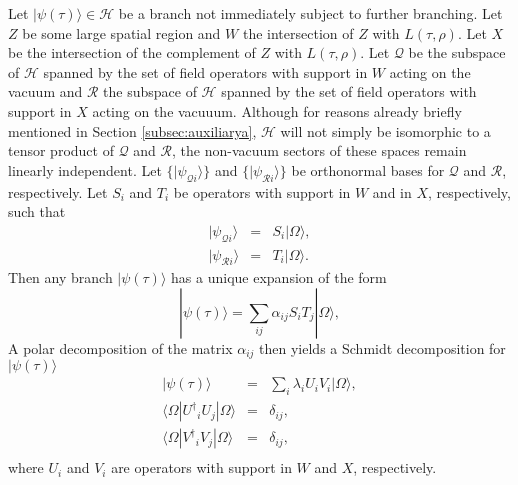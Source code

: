 \documentclass[twocolumn,amsmath,amssymb]{revtex4-1}
\begin{document}
Let $|\psi( \tau) \rangle  \in \mathcal{H}$ be a branch
not immediately
subject to further branching.
Let $Z$ be some large spatial region and
$W$ the intersection of $Z$ with $L( \tau, \rho)$.
Let $X$ be the intersection of the complement
of $Z$ with $L( \tau, \rho)$.
Let $\mathcal{Q}$ be the subspace of $\mathcal{H}$ spanned
by the set of field operators with support in $W$ acting
on the vacuum
and $\mathcal{R}$ the subspace of $\mathcal{H}$ spanned
by the set of field operators with support in $X$
acting on the vacuuum.
Although for reasons 
already briefly mentioned in Section \ref{subsec:auxiliarya},
$\mathcal{H}$ will not simply be isomorphic to a tensor product of
$\mathcal{Q}$ and $\mathcal{R}$, the non-vacuum sectors of
these spaces
remain linearly independent.
Let
$\{ |\psi_{\mathcal{Q}i} \rangle  \}$ and $\{| \psi_{\mathcal{R}i} \rangle  \}$
be orthonormal bases for $\mathcal{Q}$ and $\mathcal{R}$,
respectively.
Let $S_i$ and $T_i$ be
operators with support in $W$ and in $X$, respectively,
such that
\begin{subequations}
\begin{eqnarray}
  \label{defhatq}
  |\psi_{\mathcal{Q}i} \rangle  & = & S_i |\Omega \rangle , \\
  \label{defhatr}
  |\psi_{\mathcal{R}i} \rangle  & = & T_i |\Omega \rangle .
\end{eqnarray}
\end{subequations}
Then any branch $|\psi( \tau) \rangle $ has
a unique expansion of the form
\begin{equation}
  \label{generalexpansion0}
  |\psi( \tau) \rangle  = \sum_{ij} \alpha_{ij} S_i T_j |\Omega \rangle ,
\end{equation}
A polar decomposition of the matrix $\alpha_{ij}$ then
yields a Schmidt decomposition for $|\psi(\tau) \rangle $
\begin{subequations}
\begin{eqnarray}
  \label{tensorprod}
  |\psi( \tau) \rangle  & = & \sum_i \lambda_i U_i V_i |\Omega \rangle , \\
  \label{orthonormalq}
   \langle    \Omega | {U^\dagger}_i U_j| \Omega \rangle  & = & \delta_{ij}, \\
  \label{orthonormalr}
   \langle   \Omega | {V^\dagger}_i V_j| \Omega \rangle  & = & \delta_{ij}, \\
\end{eqnarray}
\end{subequations}
where $U_i$ and $V_i$ are operators with
support in $W$ and $X$, respectively.
\end{document}
